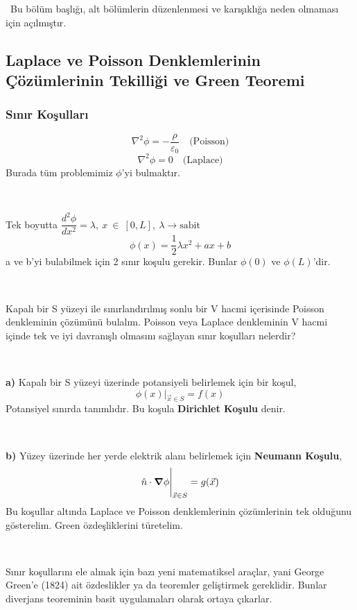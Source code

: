 \dangersign \ Bu bölüm başlığı, alt bölümlerin düzenlenmesi ve karışıklığa neden olmaması için açılmıştır.

\subsection{Laplace ve Poisson Denklemlerinin Çözümlerinin Tekilliği ve Green Teoremi}

\begin{theorem}
\subsubsection{Sınır Koşulları}
\[ \nabla^{2} \phi = - \dfrac{\rho}{\varepsilon_{0}} \quad \textrm{(Poisson)} \]
\[ \nabla^{2} \phi = 0 \quad \textrm{(Laplace)} \]
Burada tüm problemimiz $\phi$'yi bulmaktır. 

\

Tek boyutta $\dfrac{d^{2} \phi}{dx^{2}} = \lambda, \ x \ \in \ [0,L], \ \lambda \rightarrow \textrm{sabit}$
\[ \phi (x) = \dfrac{1}{2} \lambda x^{2} + ax+b\]
a ve b'yi bulabilmek için 2 sınır koşulu gerekir. Bunlar $\phi (0)$ ve $\phi (L)$'dir. 

\

Kapalı bir S yüzeyi ile sınırlandırılmış sonlu bir V hacmi içerisinde Poisson denkleminin çözümünü bulalım. Poisson veya Laplace denkleminin V hacmi içinde tek ve iyi davranışlı olmasını sağlayan sınır koşulları nelerdir?

\

\textbf{a)} Kapalı bir S yüzeyi üzerinde potansiyeli belirlemek için bir koşul,
\[ \phi (x) \Bigg|_{\Vec{x} \in S} = f (x) \]
Potansiyel sınırda tanımlıdır. Bu koşula \textbf{Dirichlet Koşulu} denir.

\ 


\textbf{b)} Yüzey üzerinde her yerde elektrik alanı belirlemek için \textbf{Neumann Koşulu},
\[ \hat{n} \cdot \grad \phi \Bigg|_{\Vec{x} \in S} = g (\Vec{x}) \]
Bu koşullar altında Laplace ve Poisson denklemlerinin çözümlerinin tek olduğunu gösterelim. Green özdeşliklerini türetelim.

\

Sınır koşullarını ele almak için bazı yeni matematiksel araçlar, yani George Green'e (1824) ait özdeslikler ya da teoremler geliştirmek gereklidir. Bunlar diverjans teoreminin basit uygulamaları olarak ortaya çıkarlar.

\


\end{theorem}
